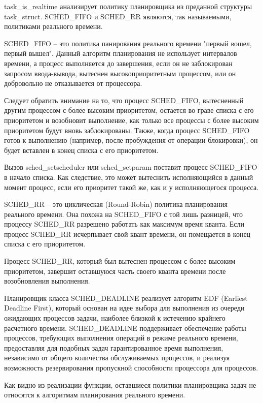 task\_is\_realtime анализирует политику планировщика из преданной структуры task\_struct. SCHED\_FIFO и SCHED\_RR являются, так называемыми, политиками реального времени. 

SCHED\_FIFO -- это политика панирования реального времени "первый  вошел, первый вышел".   Данный алгоритм планирования не использует интервалов времени, а процесс выполняется до завершения, если он не заблокирован запросом ввода-вывода, вытеснен высокоприоритетным процессом, или он добровольно не отказывается от процессора. \cite{scheduling}

Следует обратить внимание на то, что процесс SCHED\_FIFO, вытесненный другим процессом с более высоким приоритетом, остается во граве списка с его приоритетом и возобновит выполнение, как только все процессы с более высоким приоритетом будут вновь заблокированы. Также, когда процесс SCHED\_FIFO готов к выполнению (например, после пробуждения от операции блокировки), он будет вставлен в конец списка с его приоритетом. \cite{scheduling}

Вызов sched\_setscheduler или sched\_setparam поставит процесс SCHED\_FIFO в начало списка. Как следствие, это может вытеснить исполняющийся в данный момент процесс, если его приоритет такой же, как и у исполняющегося процесса. \cite{scheduling}

SCHED\_RR -- это циклическая (Round-Robin) политика планирования реального времени. Она похожа на SCHED\_FIFO с той лишь разницей, что процессу SCHED\_RR разрешено работать как максимум время кванта. Если процесс SCHED\_RR исчерпывает свой квант времени, он помещается в конец списка с его приоритетом. \cite{scheduling}

Процесс SCHED\_RR, который был вытеснен процессом с более высоким приоритетом, завершит оставшуюся часть своего кванта времени после возобновления выполнения. \cite{scheduling}

Планировщик класса SCHED\_DEADLINE реализует алгоритм EDF (Earliest Deadline First), который основан на идее выбора для выполнения из очереди ожидающих процессов задачи, наиболее близкой к истечению крайнего расчетного времени. SCHED\_DEADLINE поддерживает обеспечение работы процессов, требующих выполнения операций в режиме реального времени, предоставляя для подобных задач гарантированное время выполнения, независимо от общего количества обслуживаемых процессов, и реализуя возможность резервирования пропускной способности процессора для процессов. \cite{sched_deadline}

Как видно из реализации функции, оставшиеся политики планировщика задач не относятся к алгоритмам планирования реального времени.

